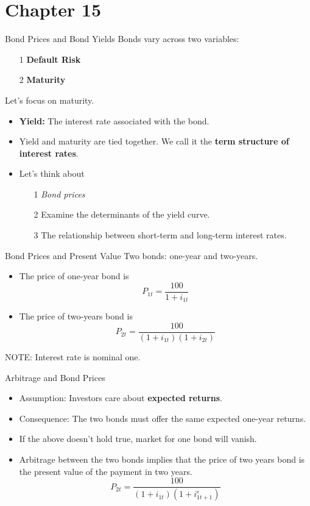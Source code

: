 \documentclass[shownotes,11pt, aspectratio=169]{beamer}
\begin{document}
\section{Chapter 15}
\begin{frame}{Bond Prices and Bond Yields}
Bonds vary across two variables: 
\begin{itemize}
\item[1] \textbf{Default Risk}
\item[2] \textbf{Maturity}
\end{itemize}
\pause
Let's focus on maturity.
\begin{itemize}
\item \textbf{Yield:} \pause The interest rate associated with the bond.
\item Yield and maturity are tied together. We call it the \textbf{term structure of interest rates}.
\pause
\item Let's think about 
     \begin{itemize}
     \item[1] \textit{Bond prices}
     \item[2] Examine the determinants of the yield curve.
     \item[3] The relationship between short-term and long-term interest rates.
     \end{itemize}
\end{itemize}
\end{frame}

\begin{frame}{Bond Prices and Present Value}
Two bonds: one-year and two-years.
\begin{itemize}
\item The price of one-year bond is 
     \[ P_{1t} = \frac{100}{1 + i_{1t}} \]
\item The price of two-years bond is 
     \[ P_{2t} = \frac{100}{(1 + i_{1t})(1 + i_{2t})} \]
\end{itemize}
NOTE: Interest rate is nominal one.
\end{frame}

\begin{frame}{Arbitrage and Bond Prices}
\begin{itemize}
\item Assumption: Investors care about \textbf{expected returns}.
\item Consequence: The two bonds must offer the same expected one-year returns.
\pause
\item If the above doesn't hold true, market for one bond will vanish. 
\pause
\item Arbitrage between the two bonds implies that the price of two years bond is the present value of the payment in two years.
\[ P_{2t} = \frac{100}{(1 + i_{1t})(1 + i_{1t + 1}^e)} \]
\end{itemize}
\end{frame}
\end{document}
